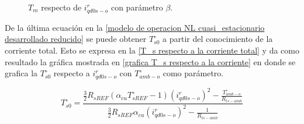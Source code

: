 \documentclass[a4paper, 10pt, onecolumn,journal]{ieeeconf}
\begin{document}
\begin{figure}[thpb]
    \centering
    \begin{adjustbox}{scale = 0.6}
    \end{adjustbox}
    \caption{$T_m$ respecto de $i^r_{qd0s-o}$ con parámetro $\beta$.}
    \label{T_m respecto a i_qd0s-o}
\end{figure}

De la última ecuación en la \cref{modelo de operacion NL cuasi_estacionario desarrollado reducido}
se puede obtener $T^{\circ}_{s0}$ a partir del conocimiento de la corriente total. Esto se expresa en la
\cref{T_s respecto a la corriente total} y da como resultado la gráfica mostrada en \cref{grafica T_s respecto a la corriente} en donde
se grafica la $T^{\circ}_{s0}$ respecto a $i^{r}_{qd0s-o}$ con $T^{\circ}_{amb-o}$ como parámetro.

\begin{equation}
    T^{\circ}_{s0} = \frac{\frac{3}{2}R_{sREF}\left(\alpha_{cu}T^{\circ}_{sREF} - 1\right)\left(i^{r}_{qd0s-o}\right)^2 - \frac{T^{\circ}_{amb-o}}{R_{ts-amb}}}{\frac{3}{2}R_{sREF}\alpha_{cu}\left(i^{r}_{qd0s-o}\right)^2 - \frac{1}{R_{ts-amb}}}
    \label{T_s respecto a la corriente total}
\end{equation}
\end{document}
